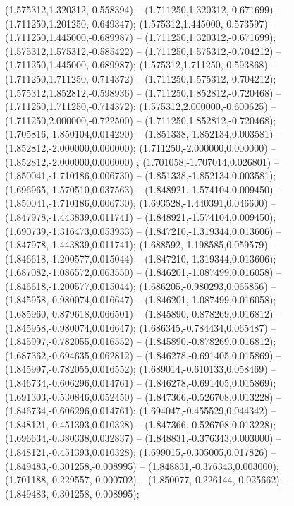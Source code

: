  (1.575312,1.320312,-0.558394) -- (1.711250,1.320312,-0.671699) -- (1.711250,1.201250,-0.649347);
 (1.575312,1.445000,-0.573597) -- (1.711250,1.445000,-0.689987) -- (1.711250,1.320312,-0.671699);
 (1.575312,1.575312,-0.585422) -- (1.711250,1.575312,-0.704212) -- (1.711250,1.445000,-0.689987);
 (1.575312,1.711250,-0.593868) -- (1.711250,1.711250,-0.714372) -- (1.711250,1.575312,-0.704212);
 (1.575312,1.852812,-0.598936) -- (1.711250,1.852812,-0.720468) -- (1.711250,1.711250,-0.714372);
 (1.575312,2.000000,-0.600625) -- (1.711250,2.000000,-0.722500) -- (1.711250,1.852812,-0.720468);
 (1.705816,-1.850104,0.014290) -- (1.851338,-1.852134,0.003581) -- (1.852812,-2.000000,0.000000);
 (1.711250,-2.000000,0.000000) -- (1.852812,-2.000000,0.000000) ;
 (1.701058,-1.707014,0.026801) -- (1.850041,-1.710186,0.006730) -- (1.851338,-1.852134,0.003581);
 (1.696965,-1.570510,0.037563) -- (1.848921,-1.574104,0.009450) -- (1.850041,-1.710186,0.006730);
 (1.693528,-1.440391,0.046600) -- (1.847978,-1.443839,0.011741) -- (1.848921,-1.574104,0.009450);
 (1.690739,-1.316473,0.053933) -- (1.847210,-1.319344,0.013606) -- (1.847978,-1.443839,0.011741);
 (1.688592,-1.198585,0.059579) -- (1.846618,-1.200577,0.015044) -- (1.847210,-1.319344,0.013606);
 (1.687082,-1.086572,0.063550) -- (1.846201,-1.087499,0.016058) -- (1.846618,-1.200577,0.015044);
 (1.686205,-0.980293,0.065856) -- (1.845958,-0.980074,0.016647) -- (1.846201,-1.087499,0.016058);
 (1.685960,-0.879618,0.066501) -- (1.845890,-0.878269,0.016812) -- (1.845958,-0.980074,0.016647);
 (1.686345,-0.784434,0.065487) -- (1.845997,-0.782055,0.016552) -- (1.845890,-0.878269,0.016812);
 (1.687362,-0.694635,0.062812) -- (1.846278,-0.691405,0.015869) -- (1.845997,-0.782055,0.016552);
 (1.689014,-0.610133,0.058469) -- (1.846734,-0.606296,0.014761) -- (1.846278,-0.691405,0.015869);
 (1.691303,-0.530846,0.052450) -- (1.847366,-0.526708,0.013228) -- (1.846734,-0.606296,0.014761);
 (1.694047,-0.455529,0.044342) -- (1.848121,-0.451393,0.010328) -- (1.847366,-0.526708,0.013228);
 (1.696634,-0.380338,0.032837) -- (1.848831,-0.376343,0.003000) -- (1.848121,-0.451393,0.010328);
 (1.699015,-0.305005,0.017826) -- (1.849483,-0.301258,-0.008995) -- (1.848831,-0.376343,0.003000);
 (1.701188,-0.229557,-0.000702) -- (1.850077,-0.226144,-0.025662) -- (1.849483,-0.301258,-0.008995);
